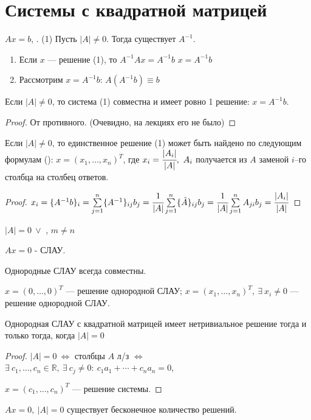 \chapter{Системы с квадратной матрицей}
$Ax=b$, . (1)
Пусть $|A|\neq0$. Тогда существует $A^{-1}$.
\begin{enumerate}
\item Если $x$ --- решение (1), то $A^{-1}Ax=A^{-1}b$ \then $x=A^{-1}b$
\item Рассмотрим $x=A^{-1}b$: $A(A^{-1}b)\equiv b$
\end{enumerate}
\begin{theor}
Если $|A|\neq0$, то система (1) совместна и имеет ровно 1 решение: $x=A^{-1}b$.
\end{theor}
\begin{proof}
От противного. (Очевидно, на лекциях его не было)
\end{proof}
\begin{theor}
Если $|A|\neq0$, то единственное решение (1) может быть найдено по следующим формулам (): $x=(x_1,\ldots,x_n)^T$, где $x_i=\cfrac{|A_i|}{|A|},\ A_i$ получается из $A$ заменой $i$--го столбца на столбец ответов.
\end{theor}
\begin{proof}
$x_i=\{A^{-1}b\}_i=\sum\limits_{j=1}^n\{A^{-1}\}_{ij}b_j=\cfrac1{|A|}\sum\limits_{j=1}^n\{\hat{A}\}_{ij}b_j=\cfrac1{|A|}\sum\limits_{j=1}^nA_{ji}b_j=\cfrac{|A_i|}{|A|}$
\end{proof}
$|A|=0\ \lor$ , $m\neq n$
\begin{opred}
$Ax=0$ -  СЛАУ.
\end{opred}
Однородные СЛАУ всегда совместны.
\begin{opred}
$x=(0,\ldots,0)^T$ ---  решение однородной СЛАУ; $x=(x_1,\ldots,x_n)^T,\ \exists\ x_i\neq0$ ---  решение однородной СЛАУ.
\end{opred}
\begin{theor}
Однородная СЛАУ с квадратной матрицей имеет нетривиальное решение тогда и только тогда, когда $|A|=0$
\end{theor}
\begin{proof}
$|A|=0\ \Leftrightarrow$ столбцы $A$ л/з $\Leftrightarrow$ $\exists\ c_1,\ldots,c_n\in\mathbb{R},\ \exists\ c_j\neq0:\ c_1a_1+\cdots+c_na_n=0$,

$x=(c_1,\ldots,c_n)^T$ --- решение системы.
\end{proof}
\begin{remark}
$Ax=0,\ |A|=0$ \then существует бесконечное количество решений.
\end{remark}
